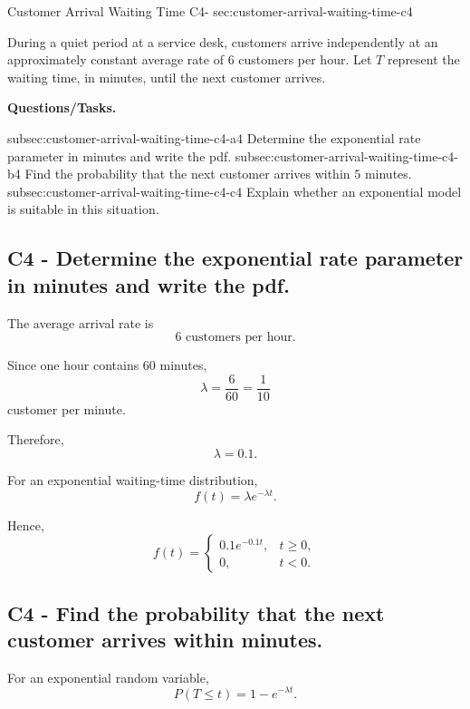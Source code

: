 	\sectionScored
	{Customer Arrival Waiting Time}
	{C4-}
	{sec:customer-arrival-waiting-time-c4}
	{
	During a quiet period at a service desk, customers arrive independently at an approximately constant average rate of $6$ customers per hour. Let $T$ represent the waiting time, in minutes, until the next customer arrives.
	
	\textbf{Questions/Tasks.}
	\begin{enumerate}
		\CriterionTask
		{subsec:customer-arrival-waiting-time-c4-a}{4}
		{Determine the exponential rate parameter in minutes and write the pdf. }
		\CriterionTask
		{subsec:customer-arrival-waiting-time-c4-b}{4}
		{Find the probability that the next customer arrives within $5$ minutes. }
		\CriterionTask
		{subsec:customer-arrival-waiting-time-c4-c}{4}
		{Explain whether an exponential model is suitable in this situation. }
	\end{enumerate}
	
	\label{subsec:customer-arrival-waiting-time-c4-a}
	\subsection*{C4 - Determine the exponential rate parameter in minutes and write the pdf. }
	
	The average arrival rate is
	\[
	6\text{ customers per hour}.
	\]
	
	Since one hour contains $60$ minutes,
	\[
	\lambda=\frac{6}{60}
	=\frac{1}{10}
	\]
	customer per minute.
	
	Therefore,
	\[
	\lambda=0.1.
	\]
	
	For an exponential waiting-time distribution,
	\[
	f(t)=\lambda e^{-\lambda t}.
	\]
	
	Hence,
	\[
	f(t)=
	\begin{cases}
		0.1e^{-0.1t}, & t\ge0,\\
		0, & t<0.
	\end{cases}
	\]
	

	\label{subsec:customer-arrival-waiting-time-c4-b}
	\subsection*{C4 - Find the probability that the next customer arrives within  minutes. }
	
	For an exponential random variable,
	\[
	P(T\le t)=1-e^{-\lambda t}.
	\]
	
}
